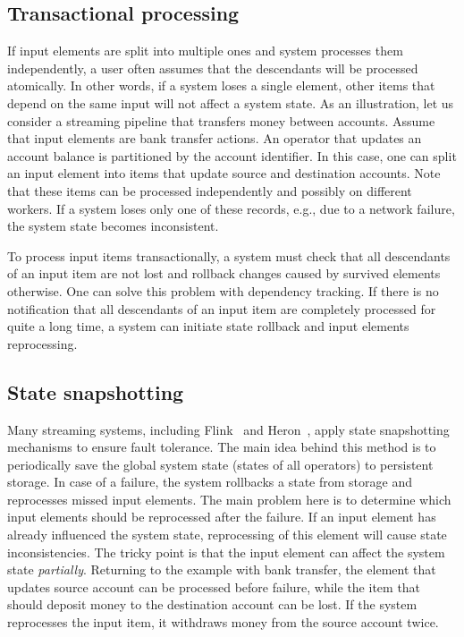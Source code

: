 \subsection{Transactional processing}
If input elements are split into multiple ones and system processes them independently, a user often assumes that the descendants will be processed atomically. In other words, if a system loses a single element, other items that depend on the same input will not affect a system state. As an illustration, let us consider a streaming pipeline that transfers money between accounts. Assume that input elements are bank transfer actions. An operator that updates an account balance is partitioned by the account identifier. In this case, one can split an input element into items that update source and destination accounts. Note that these items can be processed independently and possibly on different workers. If a system loses only one of these records, e.g., due to a network failure, the system state becomes inconsistent.

To process input items transactionally, a system must check that all descendants of an input item are not lost and rollback changes caused by survived elements otherwise. One can solve this problem with dependency tracking. If there is no notification that all descendants of an input item are completely processed for quite a long time, a system can initiate state rollback and input elements reprocessing.

\subsection{State snapshotting}
Many streaming systems, including Flink~\cite{Carbone:2017:SMA:3137765.3137777} and Heron~\cite{Kulkarni:2015:THS:2723372.2742788}, apply state snapshotting mechanisms to ensure fault tolerance. The main idea behind this method is to periodically save the global system state (states of all operators) to persistent storage. In case of a failure, the system rollbacks a state from storage and reprocesses missed input elements. The main problem here is to determine which input elements should be reprocessed after the failure. If an input element has already influenced the system state, reprocessing of this element will cause state inconsistencies. The tricky point is that the input element can affect the system state {\em partially}. Returning to the example with bank transfer, the element that updates source account can be processed before failure, while the item that should deposit money to the destination account can be lost. If the system reprocesses the input item, it withdraws money from the source account twice.

